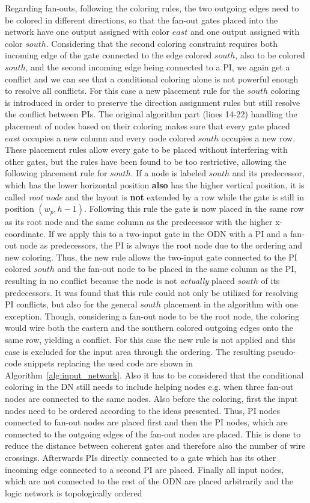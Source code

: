 Regarding fan-outs, following the coloring rules, the two outgoing edges need to be colored in different directions, so that the fan-out gates placed into the network have one output assigned with color $east$ and one output assigned with color $south$. Considering that the second coloring constraint requires both incoming edge of the gate connected to the edge colored $south$, also to be colored $south$, and the second incoming edge being connected to a PI, we again get a conflict and we can see that a conditional coloring alone is not powerful enough to resolve all conflicts. For this case a new placement rule for the $south$ coloring is introduced in order to preserve the direction assignment rules but still resolve the conflict between PIs. The original algorithm part (lines 14-22) handling the placement of nodes based on their coloring makes sure that every gate placed $east$ occupies a new column and every node colored $south$ occupies a new row. These placement rules allow every gate to be placed without interfering with other gates, but the rules have been found to be too restrictive, allowing the following placement rule for $south$. If a node is labeled $south$ and its predecessor, which has the lower horizontal position \textbf{also} has the higher vertical position, it is called \textit{root node} and the layout is \textbf{not} extended by a row while the gate is still in position $(w_p, h-1)$. Following this rule the gate is now placed in the same row as its root node and the same column as the predecessor with the higher x-coordinate. If we apply this to a two-input gate in the ODN with a PI and a fan-out node as predecessors, the PI is always the root node due to the ordering and new coloring. Thus, the new rule allows the two-input gate connected to the PI colored $south$ and the fan-out node to be placed in the same column as the PI, resulting in no conflict because the node is not \textit{actually} placed $south$ of its predecessors. It was found that this rule could not only be utilized for resolving PI conflicts, but also for the general $south$ placement in the algorithm with one exception. Though, considering a fan-out node to be the root node, the coloring would wire both the eastern and the southern colored outgoing edges onto the same row, yielding a conflict. For this case the new rule is not applied and this case is excluded for the input area through the ordering. The resulting pseudo-code snippets replacing the used code are shown in Algorithm~\ref{alg:input_network}. Also it has to be considered that the conditional coloring in the DN still needs to include helping nodes e.g. when three fan-out nodes are connected to the same nodes. Also before the coloring, first the input nodes need to be ordered according to the ideas presented. Thus, PI nodes connected to fan-out nodes are placed first and then the PI nodes, which are connected to the outgoing edges of the fan-out nodes are placed. This is done to reduce the distance between coherent gates and therefore also the number of wire crossings. Afterwards PIs directly connected to a gate which has its other incoming edge connected to a second PI are placed. Finally all input nodes, which are not connected to the rest of the ODN are placed arbitrarily and the logic network is topologically ordered 